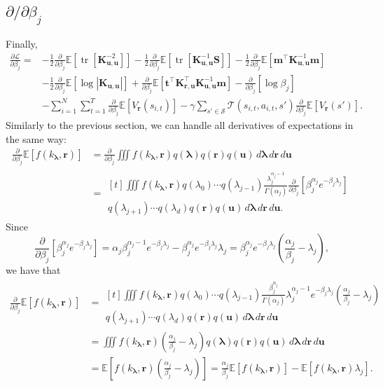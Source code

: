 \documentclass{article}
\theoremstyle{definition}
\theoremstyle{remark}
\DeclareMathOperator{\tr}{tr}
\newcommand{\Kuu}{\mathbf{K}_{\mathbf{u},\mathbf{u}}}
\newcommand{\Kru}{\mathbf{K}_{\mathbf{r},\mathbf{u}}}
\newcommand{\db}{\frac{\partial}{\partial\beta_j}}
\begin{document}
\subsection{$\partial/\partial\beta_j$}
Finally,
\[
  \begin{split}
    \frac{\partial\mathcal{L}}{\partial\beta_j} = &-
    \frac{1}{2}\db\mathbb{E}[\tr[\Kuu^{-2}]] -
    \frac{1}{2}\db\mathbb{E}[\tr[\Kuu^{-1}\mathbf{S}]] -
    \frac{1}{2}\db\mathbb{E}[\mathbf{m}^\intercal\Kuu^{-1}\mathbf{m}] \\
    &- \frac{1}{2}\db\mathbb{E}[\log|\Kuu|] +
    \db\mathbb{E}[\mathbf{t}^\intercal\Kru^\intercal\Kuu^{-1}\mathbf{m}] -
    \db[\log\beta_j] \\
    &- \sum_{i=1}^N \sum_{t=1}^T \db \mathbb{E}[V_{\mathbf{r}}(s_{i,t})] - \gamma\sum_{s'
      \in \mathcal{S}} \mathcal{T}(s_{i,t}, a_{i,t}, s')\db\mathbb{E}[V_{\mathbf{r}}(s')].
  \end{split}
\]
Similarly to the previous section, we can handle all derivatives of expectations
in the same way:
\[
  \begin{split}
    \db\mathbb{E}[f(k_{\bm\lambda}, \mathbf{r})] &= \db \iiint f(k_{\bm\lambda},
    \mathbf{r}) q(\bm\lambda) q(\mathbf{r})
    q(\mathbf{u})\,d\bm\lambda\,d\mathbf{r}\,d\mathbf{u} \\
    &= \begin{multlined}[t]
      \iiint f(k_{\bm\lambda}, \mathbf{r}) q(\lambda_0) \cdots q(\lambda_{j-1})
      \frac{\lambda_j^{\alpha_j - 1}}{\Gamma(\alpha_j)} \db [\beta_j^{\alpha_j}
      e^{-\beta_j\lambda_j}] \\
      q(\lambda_{j+1}) \cdots q(\lambda_d) q(\mathbf{r})
      q(\mathbf{u})\,d\bm\lambda\,d\mathbf{r}\,d\mathbf{u}.
    \end{multlined}
  \end{split}
\]
Since
\[ \db [\beta_j^{\alpha_j} e^{-\beta_j\lambda_j}] = \alpha_j\beta_j^{\alpha_j - 1}e^{-\beta_j\lambda_j}
  - \beta_j^{\alpha_j} e^{-\beta_j\lambda_j}\lambda_j = \beta_j^{\alpha_j}
  e^{-\beta_j\lambda_j} \left( \frac{\alpha_j}{\beta_j} - \lambda_j \right), \]
we have that
\[
  \begin{split}
    \db\mathbb{E}[f(k_{\bm\lambda}, \mathbf{r})] &= \begin{multlined}[t]
      \iiint f(k_{\bm\lambda}, \mathbf{r}) q(\lambda_0) \cdots q(\lambda_{j-1})
      \frac{\beta_j^{\alpha_j}}{\Gamma(\alpha_j)}\lambda_j^{\alpha_j -
        1}e^{-\beta_j\lambda_j} \left(\frac{\alpha_j}{\beta_j} - \lambda_j
      \right) \\
      q(\lambda_{j+1}) \cdots q(\lambda_d) q(\mathbf{r})
      q(\mathbf{u})\,d\bm\lambda\,d\mathbf{r}\,d\mathbf{u}
    \end{multlined}
    \\
    &= \iiint f(k_{\bm\lambda}, \mathbf{r}) \left(\frac{\alpha_j}{\beta_j} -
      \lambda_j \right) q(\bm\lambda) q(\mathbf{r})
    q(\mathbf{u})\,d\bm\lambda\,d\mathbf{r}\,d\mathbf{u} \\
    &= \mathbb{E} \left[ f(k_{\bm\lambda}, \mathbf{r})
      \left(\frac{\alpha_j}{\beta_j} - \lambda_j \right) \right] =
    \frac{\alpha_j}{\beta_j}\mathbb{E}[f(k_{\bm\lambda}, \mathbf{r})] -
    \mathbb{E}[f(k_{\bm\lambda}, \mathbf{r})\lambda_j].
  \end{split}
\]
\end{document}
